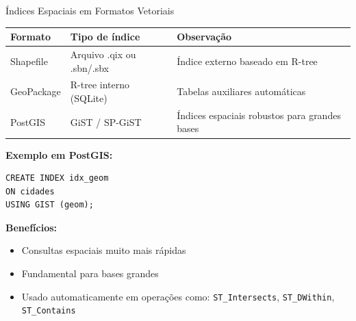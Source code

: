 \documentclass{beamer}
\begin{document}
\begin{frame}[fragile]{Índices Espaciais em Formatos Vetoriais}
    
    \begin{tabular}{p{3cm} p{3cm} p{5cm}}
        \textbf{Formato} & \textbf{Tipo de índice} & \textbf{Observação} \\
        \hline
        Shapefile & Arquivo .qix ou .sbn/.sbx & Índice externo baseado em R-tree \\
        
        GeoPackage & R-tree interno (SQLite) & Tabelas auxiliares automáticas \\
        
        PostGIS & GiST / SP-GiST & Índices espaciais robustos para grandes bases \\
    \end{tabular}
    
    \vspace{0.6cm}
    
    \textbf{Exemplo em PostGIS:}
    
    \begin{verbatim}
CREATE INDEX idx_geom
ON cidades
USING GIST (geom);
    \end{verbatim}
    
    \textbf{Benefícios:}
    
    \begin{itemize}
        \item Consultas espaciais muito mais rápidas
        \item Fundamental para bases grandes
        \item Usado automaticamente em operações como:
        \texttt{ST\_Intersects}, \texttt{ST\_DWithin}, \texttt{ST\_Contains}
    \end{itemize}
    
\end{frame}
\end{document}
